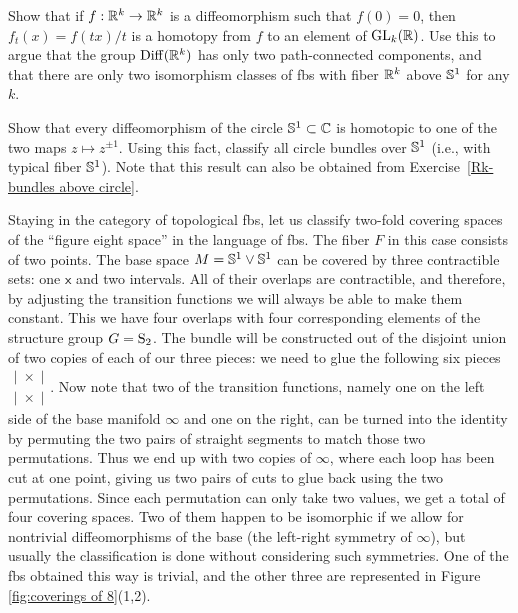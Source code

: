\begin{xca}\label{Rk-bundles above circle}
    Show that if $f:\mathbb{R}^k\to \mathbb{R}^k$ is a diffeomorphism such that $f(0)=0$, then $f_t(x)=f(tx)/t$ is a homotopy from $f$ to an element of $\operatorname{GL}_k(\mathbb{R})$. Use this to argue that the group $\operatorname{Diff}(\mathbb{R}^k)$ has only two path-connected components, and that there are only two isomorphism classes of \glspl{fb} with fiber $\mathbb{R}^k$  above $\mathbb{S}^1$ for any $k$.
\end{xca}
\begin{xca}
    Show that every diffeomorphism of the circle $\mathbb{S}^1\subset \mathbb{C}$ is homotopic to one of the two maps $z\mapsto z^{\pm 1}$. Using this fact, classify all circle bundles over $\mathbb{S}^1$ (i.e., with typical fiber $\mathbb{S}^1$). Note that this result can also be obtained from Exercise~\ref{Rk-bundles above circle}.
\end{xca}

\begin{example}
    Staying in the category of topological \glspl{fb}, let us classify two-fold covering spaces of the ``figure eight space'' in the language of \glspl{fb}. The fiber $F$ in this case consists of two points. The base space $M=\mathbb{S}^1\vee \mathbb{S}^1$ can be covered by three contractible sets: one $\mathsf{x}$ and two intervals. All of their overlaps are contractible, and therefore, by adjusting the transition functions we will always be able to make them constant. This we have four overlaps with four corresponding elements of the structure group $G=\mathrm{S}_2$. The bundle will be constructed out of the disjoint union of two copies of each of our three pieces: we need to glue the following six pieces $\begin{matrix}
        |\; \times \;|\\
        |\; \times \;|
    \end{matrix}$. Now note that two of the transition functions, namely one on the left side of the base manifold $\infty$ and one on the right, can be turned into the identity by permuting the two pairs of straight segments to match those two permutations. Thus we end up with two copies of $\infty$, where each loop has been cut at one point, giving us two pairs of cuts to glue back using the two permutations. Since each permutation can only take two values, we get a total of four covering spaces. Two of them happen to be isomorphic if we allow for nontrivial diffeomorphisms of the base (the left-right symmetry of $\infty$), but usually the classification is done without considering such symmetries. One of the \glspl{fb} obtained this way is trivial, and the other three are represented in Figure \ref{fig:coverings of 8}(1,2).
\end{example}

